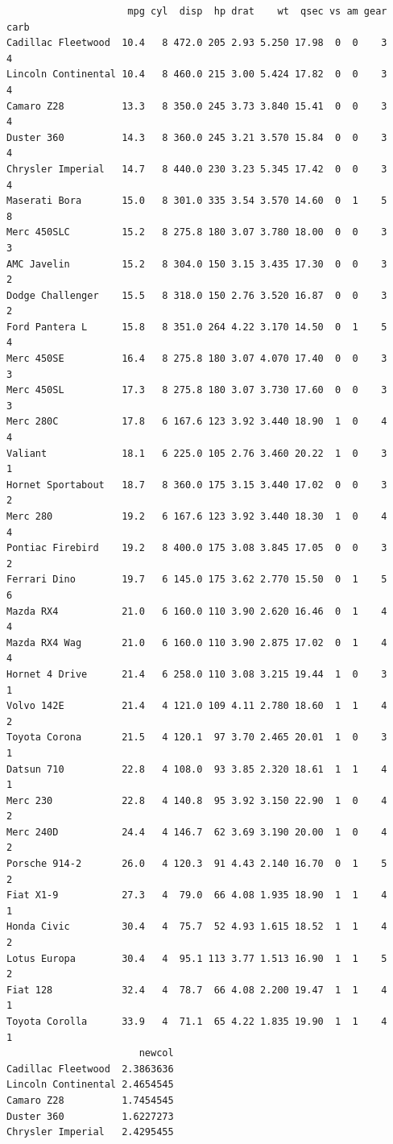 \documentclass[
]{article}
\begin{document}
\begin{verbatim}
                     mpg cyl  disp  hp drat    wt  qsec vs am gear carb
Cadillac Fleetwood  10.4   8 472.0 205 2.93 5.250 17.98  0  0    3    4
Lincoln Continental 10.4   8 460.0 215 3.00 5.424 17.82  0  0    3    4
Camaro Z28          13.3   8 350.0 245 3.73 3.840 15.41  0  0    3    4
Duster 360          14.3   8 360.0 245 3.21 3.570 15.84  0  0    3    4
Chrysler Imperial   14.7   8 440.0 230 3.23 5.345 17.42  0  0    3    4
Maserati Bora       15.0   8 301.0 335 3.54 3.570 14.60  0  1    5    8
Merc 450SLC         15.2   8 275.8 180 3.07 3.780 18.00  0  0    3    3
AMC Javelin         15.2   8 304.0 150 3.15 3.435 17.30  0  0    3    2
Dodge Challenger    15.5   8 318.0 150 2.76 3.520 16.87  0  0    3    2
Ford Pantera L      15.8   8 351.0 264 4.22 3.170 14.50  0  1    5    4
Merc 450SE          16.4   8 275.8 180 3.07 4.070 17.40  0  0    3    3
Merc 450SL          17.3   8 275.8 180 3.07 3.730 17.60  0  0    3    3
Merc 280C           17.8   6 167.6 123 3.92 3.440 18.90  1  0    4    4
Valiant             18.1   6 225.0 105 2.76 3.460 20.22  1  0    3    1
Hornet Sportabout   18.7   8 360.0 175 3.15 3.440 17.02  0  0    3    2
Merc 280            19.2   6 167.6 123 3.92 3.440 18.30  1  0    4    4
Pontiac Firebird    19.2   8 400.0 175 3.08 3.845 17.05  0  0    3    2
Ferrari Dino        19.7   6 145.0 175 3.62 2.770 15.50  0  1    5    6
Mazda RX4           21.0   6 160.0 110 3.90 2.620 16.46  0  1    4    4
Mazda RX4 Wag       21.0   6 160.0 110 3.90 2.875 17.02  0  1    4    4
Hornet 4 Drive      21.4   6 258.0 110 3.08 3.215 19.44  1  0    3    1
Volvo 142E          21.4   4 121.0 109 4.11 2.780 18.60  1  1    4    2
Toyota Corona       21.5   4 120.1  97 3.70 2.465 20.01  1  0    3    1
Datsun 710          22.8   4 108.0  93 3.85 2.320 18.61  1  1    4    1
Merc 230            22.8   4 140.8  95 3.92 3.150 22.90  1  0    4    2
Merc 240D           24.4   4 146.7  62 3.69 3.190 20.00  1  0    4    2
Porsche 914-2       26.0   4 120.3  91 4.43 2.140 16.70  0  1    5    2
Fiat X1-9           27.3   4  79.0  66 4.08 1.935 18.90  1  1    4    1
Honda Civic         30.4   4  75.7  52 4.93 1.615 18.52  1  1    4    2
Lotus Europa        30.4   4  95.1 113 3.77 1.513 16.90  1  1    5    2
Fiat 128            32.4   4  78.7  66 4.08 2.200 19.47  1  1    4    1
Toyota Corolla      33.9   4  71.1  65 4.22 1.835 19.90  1  1    4    1
                       newcol
Cadillac Fleetwood  2.3863636
Lincoln Continental 2.4654545
Camaro Z28          1.7454545
Duster 360          1.6227273
Chrysler Imperial   2.4295455

\end{verbatim}
\end{document}
